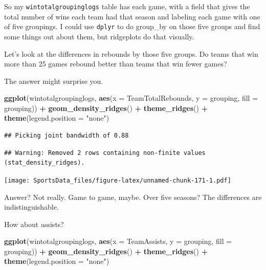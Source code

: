 \documentclass[
]{book}
\newenvironment{Shaded}{\begin{snugshade}}{\end{snugshade}}
\newcommand{\DataTypeTok}[1]{\textcolor[rgb]{0.13,0.29,0.53}{#1}}
\newcommand{\KeywordTok}[1]{\textcolor[rgb]{0.13,0.29,0.53}{\textbf{#1}}}
\newcommand{\NormalTok}[1]{#1}
\newcommand{\OperatorTok}[1]{\textcolor[rgb]{0.81,0.36,0.00}{\textbf{#1}}}
\newcommand{\StringTok}[1]{\textcolor[rgb]{0.31,0.60,0.02}{#1}}
\begin{document}
So my \texttt{wintotalgroupinglogs} table has each game, with a field that gives the total number of wins each team had that season and labeling each game with one of five groupings. I could use \texttt{dplyr} to do group\_by on those five groups and find some things out about them, but ridgeplots do that visually.

Let's look at the differences in rebounds by those five groups. Do teams that win more than 25 games rebound better than teams that win fewer games?

The answer might surprise you.

\begin{Shaded}
\begin{Highlighting}[]
\KeywordTok{ggplot}\NormalTok{(wintotalgroupinglogs, }\KeywordTok{aes}\NormalTok{(}\DataTypeTok{x =}\NormalTok{ TeamTotalRebounds, }\DataTypeTok{y =}\NormalTok{ grouping, }\DataTypeTok{fill =}\NormalTok{ grouping)) }\OperatorTok{+}
\StringTok{  }\KeywordTok{geom_density_ridges}\NormalTok{() }\OperatorTok{+}
\StringTok{  }\KeywordTok{theme_ridges}\NormalTok{() }\OperatorTok{+}\StringTok{ }
\StringTok{  }\KeywordTok{theme}\NormalTok{(}\DataTypeTok{legend.position =} \StringTok{"none"}\NormalTok{)}
\end{Highlighting}
\end{Shaded}

\begin{verbatim}
## Picking joint bandwidth of 0.88
\end{verbatim}

\begin{verbatim}
## Warning: Removed 2 rows containing non-finite values (stat_density_ridges).
\end{verbatim}

\texttt{[image: SportsData\_files/figure-latex/unnamed-chunk-171-1.pdf]}

Answer? Not really. Game to game, maybe. Over five seasons? The differences are indistinguishable.

How about assists?

\begin{Shaded}
\begin{Highlighting}[]
\KeywordTok{ggplot}\NormalTok{(wintotalgroupinglogs, }\KeywordTok{aes}\NormalTok{(}\DataTypeTok{x =}\NormalTok{ TeamAssists, }\DataTypeTok{y =}\NormalTok{ grouping, }\DataTypeTok{fill =}\NormalTok{ grouping)) }\OperatorTok{+}
\StringTok{  }\KeywordTok{geom_density_ridges}\NormalTok{() }\OperatorTok{+}
\StringTok{  }\KeywordTok{theme_ridges}\NormalTok{() }\OperatorTok{+}\StringTok{ }
\StringTok{  }\KeywordTok{theme}\NormalTok{(}\DataTypeTok{legend.position =} \StringTok{"none"}\NormalTok{)}
\end{Highlighting}
\end{Shaded}
\end{document}

